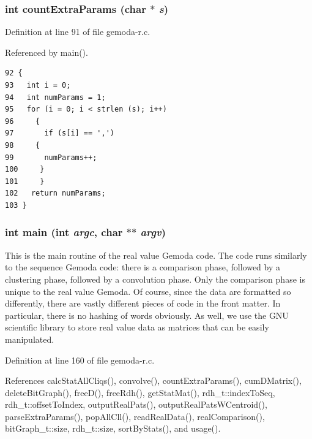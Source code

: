 \hypertarget{gemoda-r_8c_a3}{
\subsubsection[countExtraParams]{\setlength{\rightskip}{0pt plus 5cm}int count\-Extra\-Params (char $\ast$ {\em s})}}
\label{gemoda-r_8c_a3}




Definition at line 91 of file gemoda-r.c.

Referenced by main().

\scriptsize\begin{verbatim}92 {
93   int i = 0;
94   int numParams = 1;
95   for (i = 0; i < strlen (s); i++)
96     {
97       if (s[i] == ',')
98     {
99       numParams++;
100     }
101     }
102   return numParams;
103 }
\end{verbatim}
\normalsize 


\hypertarget{gemoda-r_8c_a5}{
\subsubsection[main]{\setlength{\rightskip}{0pt plus 5cm}int main (int {\em argc}, char $\ast$$\ast$ {\em argv})}}
\label{gemoda-r_8c_a5}


This is the main routine of the real value Gemoda code. The code runs similarly to the sequence Gemoda code: there is a comparison phase, followed by a clustering phase, followed by a convolution phase. Only the comparison phase is unique to the real value Gemoda. Of course, since the data are formatted so differently, there are vastly different pieces of code in the front matter. In particular, there is no hashing of words obviously. As well, we use the GNU scientific library to store real value data as matrices that can be easily manipulated.

Definition at line 160 of file gemoda-r.c.

References calc\-Stat\-All\-Cliqs(), convolve(), count\-Extra\-Params(), cum\-DMatrix(), delete\-Bit\-Graph(), free\-D(), free\-Rdh(), get\-Stat\-Mat(), rdh\_\-t::index\-To\-Seq, rdh\_\-t::offset\-To\-Index, output\-Real\-Pats(), output\-Real\-Pats\-WCentroid(), parse\-Extra\-Params(), pop\-All\-Cll(), read\-Real\-Data(), real\-Comparison(), bit\-Graph\_\-t::size, rdh\_\-t::size, sort\-By\-Stats(), and usage().

